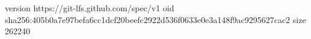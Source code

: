 version https://git-lfs.github.com/spec/v1
oid sha256:405b0a7e97befa6cc1dcf20beefc2922d536f0633e0e3a148f9ac9295627cac2
size 262240
